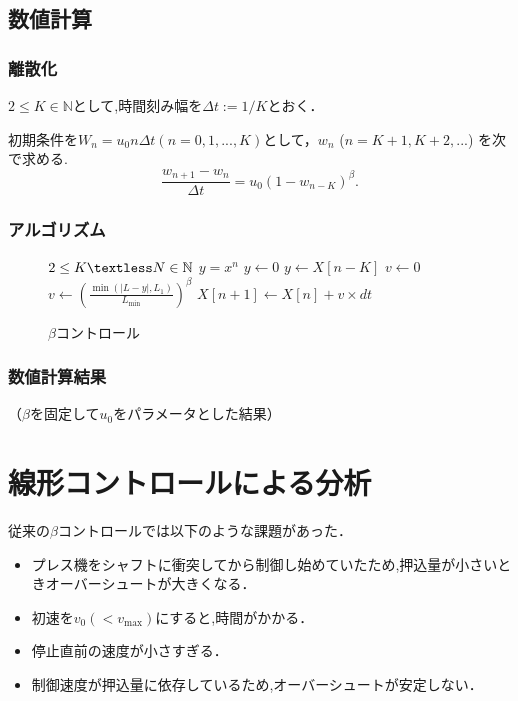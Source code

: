 \documentclass [dvipdfmx] {jsarticle}
\numberwithin{equation}{section}
\theoremstyle{definition} %
\theoremstyle{definition} %
\begin{document}
\subsection{数値計算}
\subsubsection{離散化}
$2\le K\in\mathbb{N}$として,時間刻み幅を$\Delta t:=1/K$とおく．

初期条件を$W_n=u_0n\Delta t (n=0,1,...,K)$として，$w_n $ ($n=K+1,K+2,...$)
を次で求める.
\begin{equation}
    \displaystyle\frac{w_{n+1}-w_n}{\Delta t}=u_0(1-w_{n-K})^\beta.
\end{equation}
\subsubsection{アルゴリズム}
\begin{figure}[h]
    \begin{algorithm}[H]
        \caption{$\beta$コントロール}
        \label{alg1}
        \begin{algorithmic}[1]    
        \REQUIRE $2\le K \textless N\in\mathbb{N}$
        \ENSURE $y = x^n$
        \STATE $y \leftarrow 0$
        \ELSE
        \STATE $y \leftarrow X[n-K]$
        \ENDIF
        \STATE $v \leftarrow 0$
        \ELSE
        \STATE $v \leftarrow \left(\displaystyle\frac{\min(|L-y|,L_1)}{L_{\min}}\right)^\beta$
        \ENDIF
        \STATE $X[n+1]\leftarrow X[n]+v\times dt$
        \ENDFOR
        \end{algorithmic}
    \end{algorithm}
\end{figure}
\subsubsection{数値計算結果}
（$\beta$を固定して$u_0$をパラメータとした結果）
\section{線形コントロールによる分析}
従来の$\beta$コントロールでは以下のような課題があった．
\begin{itemize}
    \item プレス機をシャフトに衝突してから制御し始めていたため,押込量が小さいときオーバーシュートが大きくなる．
    \item 初速を$v_0(<v_{\max})$にすると,時間がかかる．
    \item 停止直前の速度が小さすぎる．
    \item 制御速度が押込量に依存しているため,オーバーシュートが安定しない．
\end{itemize}
\end{document}
